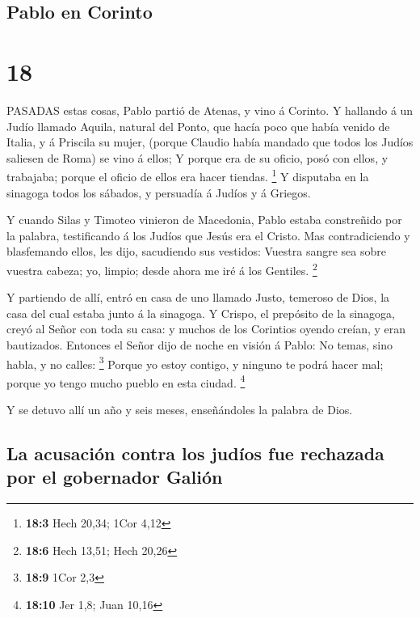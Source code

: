 \hypertarget{pablo-en-corinto}{%
\subsection{Pablo en Corinto}\label{pablo-en-corinto}}

\hypertarget{section-17}{%
\section{18}\label{section-17}}

 PASADAS estas cosas, Pablo partió de Atenas, y vino á
Corinto.  Y hallando á un Judío llamado Aquila, natural del
Ponto, que hacía poco que había venido de Italia, y á Priscila su mujer,
(porque Claudio había mandado que todos los Judíos saliesen de Roma) se
vino á ellos;  Y porque era de su oficio, posó con ellos, y
trabajaba; porque el oficio de ellos era hacer tiendas. \footnote{\textbf{18:3}
  Hech 20,34; 1Cor 4,12}  Y disputaba en la sinagoga todos
los sábados, y persuadía á Judíos y á Griegos.

 Y cuando Silas y Timoteo vinieron de Macedonia, Pablo
estaba constreñido por la palabra, testificando á los Judíos que Jesús
era el Cristo.  Mas contradiciendo y blasfemando ellos, les
dijo, sacudiendo sus vestidos: Vuestra sangre sea sobre vuestra cabeza;
yo, limpio; desde ahora me iré á los Gentiles. \footnote{\textbf{18:6}
  Hech 13,51; Hech 20,26}

 Y partiendo de allí, entró en casa de uno llamado Justo,
temeroso de Dios, la casa del cual estaba junto á la sinagoga.
 Y Crispo, el prepósito de la sinagoga, creyó al Señor con
toda su casa: y muchos de los Corintios oyendo creían, y eran
bautizados.  Entonces el Señor dijo de noche en visión á
Pablo: No temas, sino habla, y no calles: \footnote{\textbf{18:9} 1Cor
  2,3}  Porque yo estoy contigo, y ninguno te podrá hacer
mal; porque yo tengo mucho pueblo en esta ciudad. \footnote{\textbf{18:10}
  Jer 1,8; Juan 10,16}

 Y se detuvo allí un año y seis meses, enseñándoles la
palabra de Dios.

\hypertarget{la-acusaciuxf3n-contra-los-juduxedos-fue-rechazada-por-el-gobernador-galiuxf3n}{%
\subsection{La acusación contra los judíos fue rechazada por el
gobernador
Galión}\label{la-acusaciuxf3n-contra-los-juduxedos-fue-rechazada-por-el-gobernador-galiuxf3n}}

